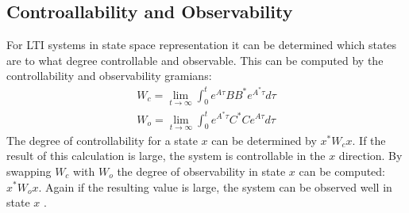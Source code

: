 \subsection{Controallability and Observability}
For LTI systems in state space representation it can be determined which states are to what degree controllable and observable.
This can be computed by the controllability and observability gramians:
\begin{gather}
W_c = \lim_{t \to \infty} \int_{0}^{t} e^{A\tau}BB^{*}e^{A^{*}\tau}d\tau \label{gram-ctrl}\\
W_o = \lim_{t \to \infty} \int_{0}^{t} e^{A^{*}\tau}C^{*}Ce^{A\tau}d\tau \label{gram-obsv}
\end{gather}
The degree of controllability for a state \(x\) can be determined by \(x^{*}W_cx\).
If the result of this calculation is large, the system is controllable in the \(x\) direction.
By swapping \(W_c\) with \(W_o\) the degree of observability in state \(x\) can be computed: \(x^{*}W_ox\).
Again if the resulting value is large, the system can be observed well in state \(x\) \cite{brunton_kutz_2019d}.
